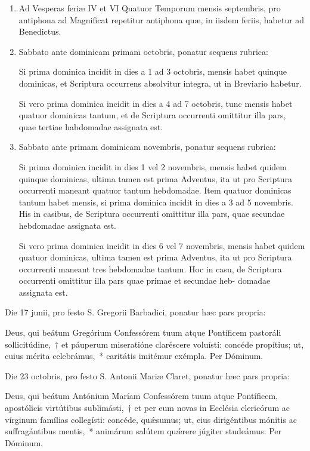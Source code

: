 \documentclass[vesperale_romanum.tex]{subfiles}
\begin{document}
\begin{enumerate}[nosep,start=37]
\item Ad Vesperas feriæ IV et VI Quatuor Temporum mensis septembris, pro antiphona ad Magnificat repetitur antiphona quæ, in iisdem feriis, habetur ad Benedictus.


\item Sabbato ante dominicam primam octobris, ponatur sequens rubrica: 

\quad Si prima dominica incidit in dies a 1 ad 3 octobris, mensis habet quinque dominicas, et Scriptura occurrens absolvitur integra, ut in Breviario habetur.

\quad Si vero prima dominica incidit in dies a 4 ad 7 octobris, tunc mensis habet quatuor dominicas tantum, et de Scriptura occurrenti omittitur illa pars, quae tertiae habdomadae assignata est.
%

\item Sabbato ante primam dominicam novembris, ponatur sequens rubrica:

\quad Si prima dominica incidit in dies 1 vel 2 novembris, mensis habet quidem quinque dominicas, ultima tamen est prima Adventus, ita ut pro Scriptura occurrenti maneant quatuor tantum hebdomadae. Item quatuor dominicas tantum habet mensis, si prima dominica incidit in dies a 3 ad 5 novembris. His in casibus, de Scriptura occurrenti omittitur illa pars, quae secundae hebdomadae assignata est. 

\quad Si vero prima dominica incidit in dies 6 vel 7 novembris, mensis habet quidem quatuor dominicas, ultima tamen est prima Adventus, ita ut pro Scriptura occurrenti maneant tres hebdomadae tantum. Hoc in casu, de Scriptura occurrenti omittitur illa pars quae primae et secundae heb- domadae assignata est.


\end{enumerate}

 Die 17 junii, pro festo S. Gregorii Barbadici, ponatur hæc pars propria:
 
\noindent Deus, qui beátum Gregórium Confessórem tuum atque Pontíficem pastoráli sollicitúdine,~† et páuperum miseratióne claréscere voluísti: concéde propítius; ut, cuius mérita celebrámus,~* caritátis imitémur exémpla.
Per Dóminum.

Die 23 octobris, pro festo S. Antonii Mariæ Claret, ponatur hæc pars propria:

\noindent Deus, qui beátum Antónium Maríam Confessórem tuum atque Pontíficem, apostólicis virtútibus sublimásti,~† et per eum novas in Ecclésia clericórum ac vírginum famílias collegísti: concéde, quǽsumus; ut, eius dirigéntibus mónitis ac suffragántibus mentis,~* animárum salútem quǽrere júgiter studeámus.
Per Dóminum.
\end{document}

